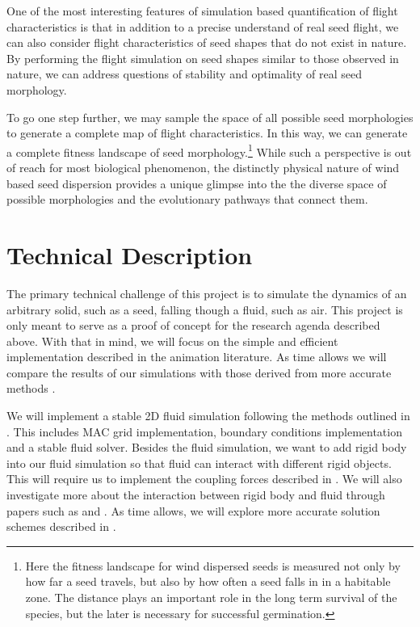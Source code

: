 \documentclass[annual]{acmsiggraph}
\begin{document}

One of the most interesting features of simulation based quantification of flight characteristics is that in addition to a precise understand of real seed flight, we can also consider flight characteristics of seed shapes that do not exist in nature. By performing the flight simulation on seed shapes similar to those observed in nature, we can address questions of stability and optimality of real seed morphology.

To go one step further, we may sample the space of all possible seed morphologies to generate a complete map of flight characteristics.  In this way, we can generate a complete fitness landscape of seed morphology.\footnote{Here the fitness landscape for wind dispersed seeds is measured not only by how far a seed travels, but also by how often a seed falls in in a habitable zone.  The distance plays an important role in the long term survival of the species, but the later is necessary for successful germination.}   While such a perspective is out of reach for most biological phenomenon, the distinctly physical nature of wind based seed dispersion provides a unique glimpse into the  the diverse space of possible morphologies and the evolutionary pathways that connect them.    

\section{Technical Description}
The primary technical challenge of this project is to simulate the dynamics of an arbitrary solid, such as a seed, falling though a fluid, such as air.  This project is only meant to serve as a proof of concept for the research agenda  described above.  With that in mind, we will focus on the simple and efficient implementation described in the animation literature.   As time allows we will compare the results of our simulations with those derived from more accurate methods \cite{wang2005-9}.

We will implement a stable 2D fluid simulation following the methods outlined in \cite{bridson2006}. This includes MAC grid implementation, boundary conditions implementation and a stable fluid solver. Besides the fluid simulation, we want to add rigid body into our fluid simulation so that fluid can interact with different rigid objects. This will require us to implement the coupling forces described in \cite{carlson2004}. We will also investigate more about the interaction between rigid body and fluid through papers such as \cite{guendelman2005} and \cite{baxter2004}.  As time allows, we will explore more accurate solution schemes described in \cite{osher2002}.
\end{document}
